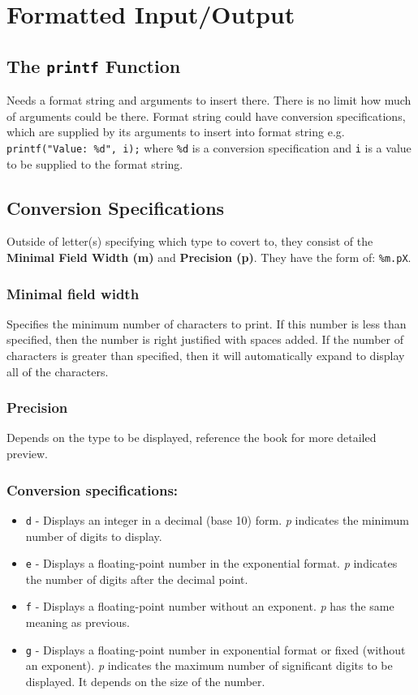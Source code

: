 \documentclass[openany]{book}
\begin{document}
    \chapter{Formatted Input/Output}

    \section{The \texttt{printf} Function}
    Needs a format string and arguments to insert there. There is no limit how much of arguments could be there. Format string could have conversion specifications, which are supplied by its arguments to insert into format string e.g. \texttt{printf("Value: \%d", i);} where \texttt{\%d} is a conversion specification and \texttt{i} is a value to be supplied to the format string.

    \section{Conversion Specifications}
    Outside of letter(s) specifying which type to covert to, they consist of the \textbf{Minimal Field Width (m)} and \textbf{Precision (p)}. They have the form of: \texttt{\%m.pX}.

    \subsection*{Minimal field width}
    Specifies the minimum number of characters to print. If this number is less than specified, then the number is right justified with spaces added. If the number of characters is greater than specified, then it will automatically expand to display all of the characters.

    \subsection*{Precision}
    Depends on the type to be displayed, reference the book for more detailed preview. 
    \newpage

    \subsection*{Conversion specifications:}
    \begin{itemize}
        \item \texttt{d} - Displays an integer in a decimal (base 10) form. \textit{p} indicates the minimum number of digits to display.
        \item \texttt{e} - Displays a floating-point number in the exponential format. \textit{p} indicates the number of digits after the decimal point.
        \item \texttt{f} - Displays a floating-point number without an exponent. \textit{p} has the same meaning as previous.
        \item \texttt{g} - Displays a floating-point number in exponential format or fixed (without an exponent). \textit{p} indicates the maximum number of significant digits to be displayed. It depends on the size of the number.
    \end{itemize}
\end{document}
